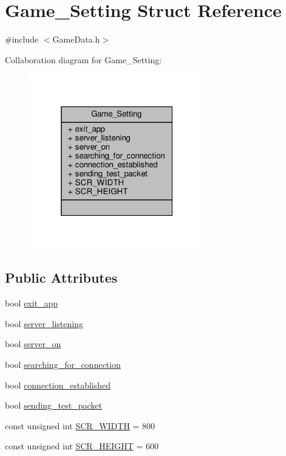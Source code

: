 \hypertarget{structGame__Setting}{}\section{Game\+\_\+\+Setting Struct Reference}
\label{structGame__Setting}


{\ttfamily \#include $<$Game\+Data.\+h$>$}



Collaboration diagram for Game\+\_\+\+Setting\+:
\nopagebreak
\begin{figure}[H]
\begin{center}
\leavevmode
\includegraphics[width=217pt]{structGame__Setting__coll__graph}
\end{center}
\end{figure}
\subsection*{Public Attributes}
\begin{DoxyCompactItemize}
\item 
bool \hyperlink{structGame__Setting_abe1e4e29aba1c9526c96fb3753d6750a}{exit\+\_\+app}
\item 
bool \hyperlink{structGame__Setting_ad9cbe44a8dd0b9bc059344479b2705a4}{server\+\_\+listening}
\item 
bool \hyperlink{structGame__Setting_a89ec65a311660f2c4cac49a1905d1d86}{server\+\_\+on}
\item 
bool \hyperlink{structGame__Setting_a9c411038e08c0bbbec1ec7f9ee42cf10}{searching\+\_\+for\+\_\+connection}
\item 
bool \hyperlink{structGame__Setting_a81a3166bc6bc27b49b3f6ae1bf6a1a11}{connection\+\_\+established}
\item 
bool \hyperlink{structGame__Setting_a2d778c2c0f89e179a1b75f1b587aa643}{sending\+\_\+test\+\_\+packet}
\item 
const unsigned int \hyperlink{structGame__Setting_adff1136dc3fef8223f57720d836c270d}{S\+C\+R\+\_\+\+W\+I\+D\+TH} = 800
\item 
const unsigned int \hyperlink{structGame__Setting_a4ce77601943647de2ab90532987073de}{S\+C\+R\+\_\+\+H\+E\+I\+G\+HT} = 600
\end{DoxyCompactItemize}


